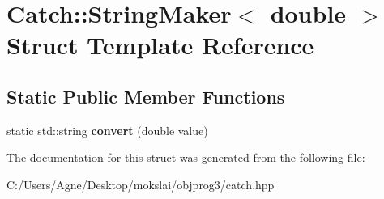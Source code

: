 \hypertarget{struct_catch_1_1_string_maker_3_01double_01_4}{}\section{Catch\+:\+:String\+Maker$<$ double $>$ Struct Template Reference}
\label{struct_catch_1_1_string_maker_3_01double_01_4}
\subsection*{Static Public Member Functions}
\begin{DoxyCompactItemize}
\item 
\mbox{\label{struct_catch_1_1_string_maker_3_01double_01_4_acaa61529acad2462292c747d34e5f3d2}} 
static std\+::string {\bfseries convert} (double value)
\end{DoxyCompactItemize}


The documentation for this struct was generated from the following file\+:\begin{DoxyCompactItemize}
\item 
C\+:/\+Users/\+Agne/\+Desktop/mokslai/objprog3/catch.\+hpp\end{DoxyCompactItemize}
